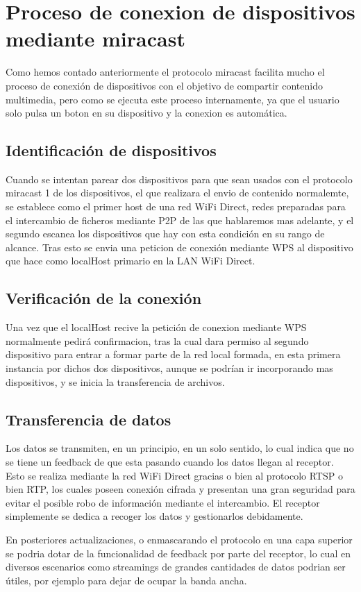 \section{Proceso de conexion de dispositivos mediante miracast}

Como hemos contado anteriormente el protocolo miracast facilita mucho el proceso de conexión de dispositivos con el objetivo de compartir contenido multimedia, pero como se ejecuta este proceso internamente, ya que el usuario solo pulsa un boton en su dispositivo y la conexion es automática.

\subsection{Identificación de dispositivos}

Cuando se intentan parear dos dispositivos para que sean usados con el protocolo miracast 1 de los dispositivos, el que realizara el envio de contenido normalemte, se establece como el primer host de una red WiFi Direct, redes preparadas para el intercambio de ficheros mediante P2P de las que hablaremos mas adelante, y el segundo escanea los dispositivos que hay con esta condición en su rango de alcance. Tras esto se envia una peticion de conexión mediante WPS al dispositivo que hace como localHost primario en la LAN WiFi Direct.

\subsection{Verificación de la conexión}

Una vez que el localHost recive la petición de conexion mediante WPS normalmente pedirá confirmacion, tras la cual dara permiso al segundo dispositivo para entrar a formar parte de la red local formada, en esta primera instancia por dichos dos dispositivos, aunque se podrían ir incorporando mas dispositivos, y se inicia la transferencia de archivos.

\subsection{Transferencia de datos}

Los datos se transmiten, en un principio, en un solo sentido, lo cual indica que no se tiene un feedback de que esta pasando cuando los datos llegan al receptor. Esto se realiza mediante la red WiFi Direct gracias o bien al protocolo RTSP o bien RTP, los cuales poseen conexión cifrada y presentan una gran seguridad para evitar el posible robo de información mediante el intercambio. El receptor simplemente se dedica a recoger los datos y gestionarlos debidamente.

En posteriores actualizaciones, o enmascarando el protocolo en una capa superior se podria dotar de la funcionalidad de feedback por parte del receptor, lo cual en diversos escenarios como streamings de grandes cantidades de datos podrian ser útiles, por ejemplo para dejar de ocupar la banda ancha.
